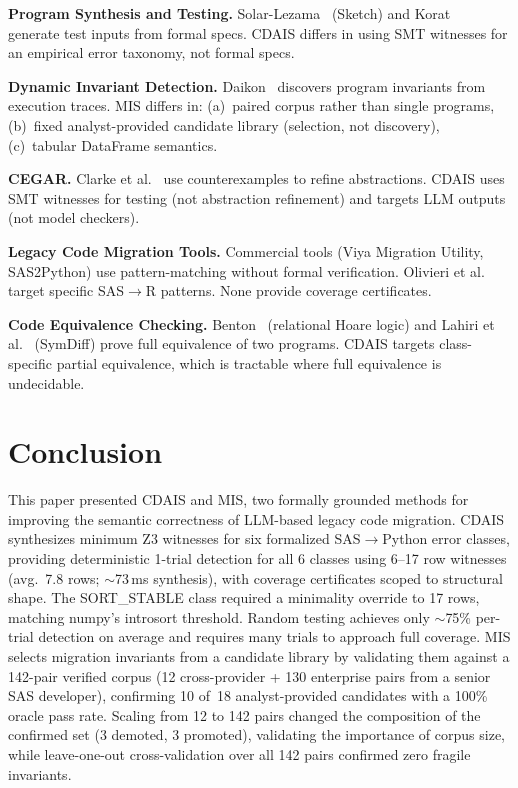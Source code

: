 \documentclass[conference]{IEEEtran}
\begin{document}
\textbf{Program Synthesis and Testing.} Solar-Lezama~\cite{sketch} (Sketch) and
Korat~\cite{korat} generate test inputs from formal specs. CDAIS differs in using SMT
witnesses for an empirical error taxonomy, not formal specs.

\textbf{Dynamic Invariant Detection.} Daikon~\cite{daikon} discovers program
invariants from execution traces. MIS differs in: (a)~paired corpus rather than
single programs, (b)~fixed analyst-provided candidate library (selection, not
discovery), (c)~tabular DataFrame semantics.

\textbf{CEGAR.} Clarke et al.~\cite{cegar} use counterexamples to refine abstractions.
CDAIS uses SMT witnesses for testing (not abstraction refinement) and targets LLM
outputs (not model checkers).

\textbf{Legacy Code Migration Tools.} Commercial tools (Viya Migration Utility,
SAS2Python) use pattern-matching without formal verification. Olivieri et
al.~\cite{olivieri} target specific SAS$\rightarrow$R patterns. None provide coverage
certificates.

\textbf{Code Equivalence Checking.} Benton~\cite{benton} (relational Hoare logic) and
Lahiri et al.~\cite{symdiff} (SymDiff) prove full equivalence of two programs. CDAIS
targets class-specific partial equivalence, which is tractable where full equivalence
is undecidable.


\section{Conclusion}

This paper presented CDAIS and MIS, two formally grounded methods for improving the
semantic correctness of LLM-based legacy code migration. CDAIS synthesizes minimum
Z3 witnesses for six formalized SAS$\rightarrow$Python error classes, providing
deterministic 1-trial detection for all 6 classes using 6--17 row witnesses
(avg.\ 7.8 rows; $\sim$73\,ms synthesis), with coverage certificates scoped to
structural shape. The SORT\_STABLE class required a minimality override to 17 rows,
matching numpy's introsort threshold. Random testing achieves only $\sim$75\%
per-trial detection on average and requires many trials to approach full coverage.
MIS selects migration invariants from a candidate library by validating them against
a 142-pair verified corpus (12 cross-provider + 130 enterprise pairs from a senior
SAS developer), confirming 10 of~18 analyst-provided candidates with a 100\% oracle
pass rate. Scaling from 12 to 142 pairs changed the composition of the confirmed
set (3 demoted, 3 promoted), validating the importance of corpus size, while
leave-one-out cross-validation over all 142 pairs confirmed zero fragile invariants.
\end{document}
